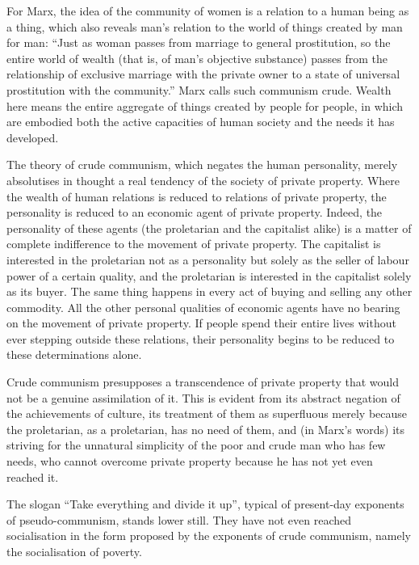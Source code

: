 \documentclass[12pt,a4paper,openany]{book}
\begin{document}
For Marx, the idea of the community of women is a relation to a human being as a thing, which also reveals man’s relation to the world of things created by man for man: “Just as woman passes from marriage to general prostitution, so the entire world of wealth (that is, of man’s objective substance) passes from the relationship of exclusive marriage with the private owner to a state of universal prostitution with the community.” Marx calls such communism crude. Wealth here means the entire aggregate of things created by people for people, in which are embodied both the active capacities of human society and the needs it has developed.

The theory of crude communism, which negates the human personality, merely absolutises in thought a real tendency of the society of private property. Where the wealth of human relations is reduced to relations of private property, the personality is reduced to an economic agent of private property. Indeed, the personality of these agents (the proletarian and the capitalist alike) is a matter of complete indifference to the movement of private property. The capitalist is interested in the proletarian not as a personality but solely as the seller of labour power of a certain quality, and the proletarian is interested in the capitalist solely as its buyer. The same thing happens in every act of buying and selling any other commodity. All the other personal qualities of economic agents have no bearing on the movement of private property. If people spend their entire lives without ever stepping outside these relations, their personality begins to be reduced to these determinations alone.

Crude communism presupposes a transcendence of private property that would not be a genuine assimilation of it. This is evident from its abstract negation of the achievements of culture, its treatment of them as superfluous merely because the proletarian, as a proletarian, has no need of them, and (in Marx’s words) its striving for the unnatural simplicity of the poor and crude man who has few needs, who cannot overcome private property because he has not yet even reached it.

The slogan “Take everything and divide it up”, typical of present-day exponents of pseudo-communism, stands lower still. They have not even reached socialisation in the form proposed by the exponents of crude communism, namely the socialisation of poverty.
\end{document}
